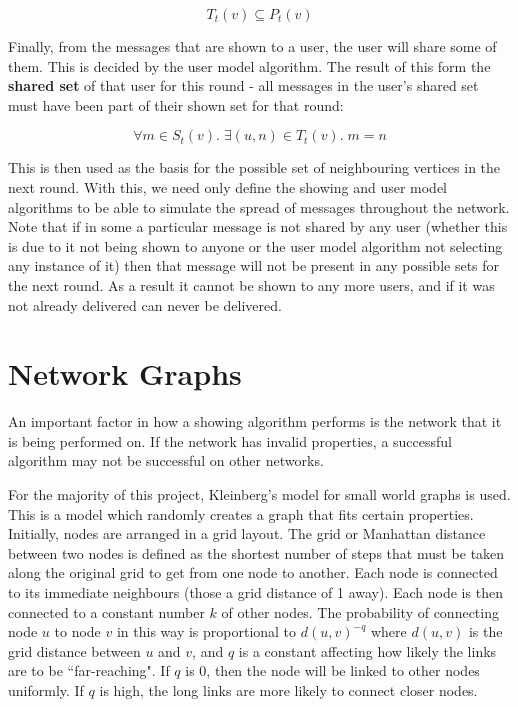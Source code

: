 \documentclass[bsc,frontabs,twoside,singlespacing,parskip,deptreport]{infthesis}     %
\begin{document}
\begin{equation}
T_{t}(v) \subseteq P_{t}(v)
\end{equation}

Finally, from the messages that are shown to a user, the user will share some of them. This is decided by the user model algorithm. The result of this form the \textbf{shared set} of that user for this round - all messages in the user's shared set must have been part of their shown set for that round:

\begin{equation}
\forall m \in S_{t}(v) .\; \exists (u, n) \in T_{t}(v) .\; m = n
\end{equation}

This is then used as the basis for the possible set of neighbouring vertices in the next round. With this, we need only define the showing and user model algorithms to be able to simulate the spread of messages throughout the network. Note that if in some a particular message is not shared by any user (whether this is due to it not being shown to anyone or the user model algorithm not selecting any instance of it) then that message will not be present in any possible sets for the next round. As a result it cannot be shown to any more users, and if it was not already delivered can never be delivered.

\section{Network Graphs} \label{sec:graph_def}
An important factor in how a showing algorithm performs is the network that it is being performed on. If the network has invalid properties, a successful algorithm may not be successful on other networks.

For the majority of this project, Kleinberg's model for small world graphs is used\cite{Kleinberg00}. This is a model which randomly creates a graph that fits certain properties. Initially, nodes are arranged in a grid layout. The grid or Manhattan distance between two nodes is defined as the shortest number of steps that must be taken along the original grid to get from one node to another. Each node is connected to its immediate neighbours (those a grid distance of 1 away). Each node is then connected to a constant number $k$ of other nodes. The probability of connecting node $u$ to node $v$ in this way is proportional to $d(u, v)^{-q}$ where $d(u, v)$ is the grid distance between $u$ and $v$, and $q$ is a constant affecting how likely the links are to be ``far-reaching". If $q$ is 0, then the node will be linked to other nodes uniformly. If $q$ is high, the long links are more likely to connect closer nodes.
\end{document}
